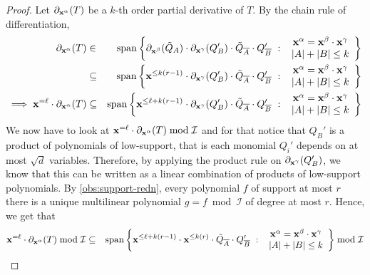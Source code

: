 \begin{proof}
Let $\partial_{\mathbf{x}^\alpha}(T)$ be a $k$-th order partial derivative of $T$. By the chain rule of differentiation,
\begin{eqnarray*}
\partial_{\mathbf{x}^\alpha}(T) & \in & \mathrm{span}\left\{{ \partial_{\mathbf{x}^\beta}(\tilde{Q}_A) \cdot \partial_{\mathbf{x}^\gamma}(Q_B') \cdot \tilde{Q}_{\overline{A}} \cdot Q_{\overline{B}}'}\ : \ {\begin{array}{c} \mathbf{x}^{\alpha} = \mathbf{x}^\beta \cdot \mathbf{x}^\gamma\\ |A| + |B| \leq k  \end{array}}\right\}\\
 & \subseteq & \mathrm{span}\left\{{ \mathbf{x}^{\leq k(r - 1)} \cdot \partial_{\mathbf{x}^\gamma}(Q_B') \cdot \tilde{Q}_{\overline{A}} \cdot Q_{\overline{B}}'}\ : \ {\begin{array}{c} \mathbf{x}^{\alpha} = \mathbf{x}^\beta \cdot \mathbf{x}^\gamma\\ |A| + |B| \leq k  \end{array}}\right\}\\
\implies \mathbf{x}^{=\ell} \cdot \partial_{\mathbf{x}^\alpha}(T) & \subseteq & \mathrm{span}\left\{{ \mathbf{x}^{\leq \ell + k(r - 1)} \cdot \partial_{\mathbf{x}^\gamma}(Q_B') \cdot \tilde{Q}_{\overline{A}} \cdot Q_{\overline{B}}'}\ : \ {\begin{array}{c} \mathbf{x}^{\alpha} = \mathbf{x}^\beta \cdot \mathbf{x}^\gamma\\ |A| + |B| \leq k  \end{array}}\right\}
\end{eqnarray*}
We now have to look at $\mathbf{x}^{=\ell} \cdot \partial_{\mathbf{x}^\alpha}(T) \bmod\mathcal{I}$ and for that notice that $Q_B'$ is a product of polynomials of low-support, that is each monomial $Q_i'$ depends on at most $\sqrt{d}$ variables. Therefore, by applying the product rule on $\partial_{\mathbf{x}^{\gamma}}(Q_B')$, we know that this can be written as a linear combination of products of low-support polynomials. By \autoref{obs:support-redn}, every polynomial $f$ of support at most $r$ there is a unique multilinear polynomial $g = f\bmod \mathcal{I}$ of degree at most $r$. Hence, we get that
\begin{eqnarray*}
\vecx^{=\ell} \cdot \partial_{\vecx^\alpha}(T) \bmod\mathcal{I} & \subseteq& \mathrm{span}\setdef{ \vecx^{\leq \ell + k(r - 1)} \cdot \vecx^{\leq k(r)} \cdot \tilde{Q}_{\overline{A}} \cdot Q_{\overline{B}}'}{\begin{array}{c} \vecx^{\alpha} = \vecx^\beta \cdot \vecx^\gamma\\ |A| + |B| \leq k  \end{array}} \bmod \mathcal{I}\\

\end{eqnarray*}
\end{proof}
